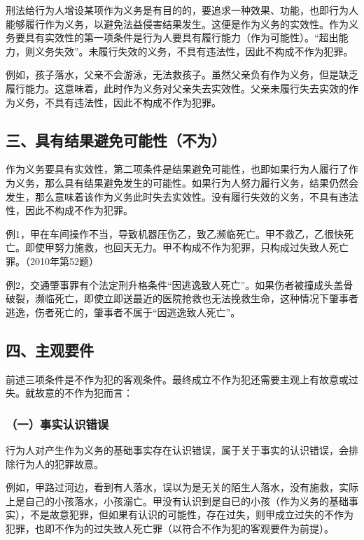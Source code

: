 刑法给行为人增设某项作为义务是有目的的，要追求一种效果、功能，也即行为人能够履行作为义务，以避免法益侵害结果发生。这便是作为义务的实效性。作为义务要具有实效性的第一项条件是行为人要具有履行能力（作为可能性）。“超出能力，则义务失效”。未履行失效的义务，不具有违法性，因此不构成不作为犯罪。

例如，孩子落水，父亲不会游泳，无法救孩子。虽然父亲负有作为义务，但是缺乏履行能力。这意味着，此时作为义务对父亲失去实效性。父亲未履行失去实效的作为义务，不具有违法性，因此不构成不作为犯罪。

\subsection*{三、具有结果避免可能性（不为）}

作为义务要具有实效性，第二项条件是结果避免可能性，也即如果行为人履行了作为义务，那么具有结果避免发生的可能性。如果行为人努力履行义务，结果仍然会发生，那么意味着该作为义务此时失去实效性。没有履行失效的义务，不具有违法性，因此不构成不作为犯罪。

例1，甲在车间操作不当，导致机器压伤乙，致乙濒临死亡。甲不救乙，乙很快死亡。即使甲努力施救，也回天无力。甲不构成不作为犯罪，只构成过失致人死亡罪。（2010年第52题）

例2，交通肇事罪有个法定刑升格条件“因逃逸致人死亡”。如果伤者被撞成头盖骨破裂，濒临死亡，即使立即送最近的医院抢救也无法挽救生命，这种情况下肇事者逃逸，伤者死亡的，肇事者不属于“因逃逸致人死亡”。

\subsection*{四、主观要件}

前述三项条件是不作为犯的客观条件。最终成立不作为犯还需要主观上有故意或过失。就故意的不作为犯而言：

\subsubsection*{（一）事实认识错误}

行为人对产生作为义务的基础事实存在认识错误，属于关于事实的认识错误，会排除行为人的犯罪故意。

例如，甲路过河边，看到有人落水，误以为是无关的陌生人落水，没有施救，实际上是自己的小孩落水，小孩溺亡。甲没有认识到是自已的小孩（作为义务的基础事实），不是故意犯罪，但如果有认识的可能性，存在过失，则甲成立过失的不作为犯罪，也即不作为的过失致人死亡罪（以符合不作为犯的客观要件为前提）。

